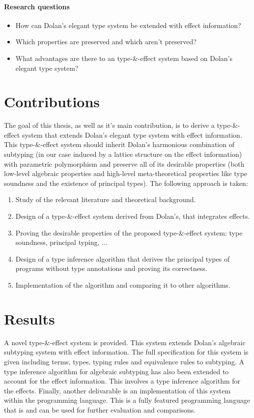 \paragraph{Research questions}
\begin{itemize}
\item How can Dolan's elegant type system be extended with effect information?
\item Which properties are preserved and which aren't preserved?
\item What advantages are there to an type-\&-effect system based on Dolan's elegant type system?
\end{itemize}

\section{Contributions}
The goal of this thesis, as well as it's main contribution, is to derive a type-\&-effect system that extends Dolan's elegant type system with effect information. This type-\&-effect system should inherit Dolan's harmonious combination of subtyping (in our case induced by a lattice structure on the effect information) with parametric polymorphism and preserve all of its desirable properties (both low-level algebraic properties and high-level meta-theoretical properties like type soundness and the existence of principal types). The following approach is taken:
\begin{enumerate}
\item Study of the relevant literature and theoretical background.
\item Design of a type-\&-effect system derived from Dolan's, that integrates effects.
\item Proving the desirable properties of the proposed type-\&-effect system: type soundness, principal typing, ...
\item Design of a type inference algorithm that derives the principal types of programs without type annotations and proving its correctness.
\item Implementation of the algorithm and comparing it to other algorithms.
\end{enumerate}

\section{Results}
A novel type-\&-effect system is provided. This system extends Dolan's algebraic subtyping system with effect information. The full specification for this system is given including terms, types, typing rules and equivalence rules to subtyping. A type inference algorithm for algebraic subtyping has also been extended to account for the effect information. This involves a type inference algorithm for the effects. Finally, another delivarable is an implementation of this system within the \eff programming language. This is a fully featured programming language that is and can be used for further evaluation and comparisons.

